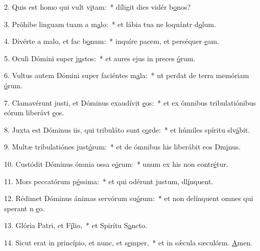 2. Quis est homo qui vult v\uline{i}tam:~* díligit dies vidér b\uline{o}nos?\par 
3. Próhibe linguam tuam a m\uline{a}lo:~* et lábia tua ne loquántr d\uline{o}lum.\par 
4. Divérte a malo, et fac b\uline{o}num:~* inquíre pacem, et perséquer \uline{e}am.\par 
5. Oculi Dómini super j\uline{u}stos:~* et aures ejus in preces \uline{ó}rum.\par 
6. Vultus autem Dómini super faciéntes m\uline{a}la:~* ut perdat de terra memóriam \uline{ó}rum.\par 
7. Clamavérunt justi, et Dóminus exaudívit \uline{e}os:~* et ex ómnibus tribulatiónibus eórum liberávt \uline{e}os.\par 
8. Juxta est Dóminus iis, qui tribuláto sunt c\uline{o}rde:~* et húmiles spíritu slv\uline{á}bit.\par 
9. Multæ tribulatiónes just\uline{ó}rum:~* et de ómnibus his liberábit eos Dm\uline{i}nus.\par 
10. Custódit Dóminus ómnia ossa e\uline{ó}rum:~* unum ex his non contr\uline{é}tur.\par 
11. Mors peccatórum p\uline{é}ssima:~* et qui odérunt justum, dl\uline{í}nquent.\par 
12. Rédimet Dóminus ánimas servórum su\uline{ó}rum:~* et non delínquent omnes qui sperant n \uline{e}o.\par 
13. Glória Patri, et F\uline{í}lio,~* et Spirítu S\uline{a}ncto.\par 
14. Sicut erat in princípio, et nunc, et s\uline{e}mper,~* et in sǽcula sæculórm. \uline{A}men.\par 
